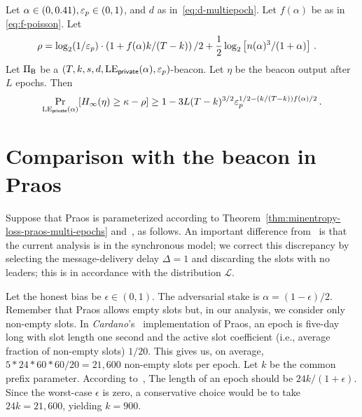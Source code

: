 \begin{theorem}\label{thm:beacon-poisson-multi-epoch}
  Let $\alpha \in (0, 0.41), \mathsf{\varepsilon}_p \in (0,1)$, 
  and $d$ as in~\eqref{eq:d-multiepoch}. 
  Let $f(\alpha)$ be as in \eqref{eq:f-poisson}.
  Let
  \begin{align}
      \rho&= \log_2(1/\mathsf{\varepsilon}_p) \cdot \left(1 + f(\alpha) k/(T-k) \right)/2
        + \frac{1}{2} \log_2 \left[ n(\alpha)^3 /(1+\alpha) \right] 
        \,.
        \label{eq:rho-poisson}
  \end{align}
  Let $\Pi_{\mathsf{B}}$ be a $(T,k,s,d,\mathrm{LE}_\mathsf{private}(\alpha), \mathsf{\varepsilon}_p)$-beacon.
  Let $\eta$ be the beacon output after $L$ epochs. 
  Then 
  $$
    \Pr_{\mathrm{LE}_\mathsf{private}(\alpha)}[H_\infty(\eta) \geq \kappa - \rho ] \geq 
      1 - 3 L (T - k)^{3/2} \mathsf{\varepsilon}_p^{1/2 - (k/(T-k)) f(\alpha)/2}
    \,.
  $$
\end{theorem}



\section{Comparison with the beacon in Praos}


Suppose that Praos is parameterized according to 
Theorem~\ref{thm:minentropy-loss-praos-multi-epochs} 
and~\cite[Theorem 9]{Praos}, as follows.
An important difference from~\cite[Theorem 9]{Praos} is that 
the current analysis is in the synchronous model; 
we correct this discrepancy by selecting the message-delivery delay $\Delta = 1$ 
and discarding the slots with no leaders; 
this is in accordance with the distribution $\mathcal{L}$.

Let the honest bias be $\epsilon \in (0,1)$.
The adversarial stake is $\alpha = (1-\epsilon)/2$. 
Remember that Praos allows empty slots but, 
in our analysis, we consider only non-empty slots. 
In \emph{Cardano}'s~\cite{Cardano} implementation of Praos, 
an epoch is five-day long with slot length one second 
and the active slot coefficient (i.e., average fraction of non-empty slots)  $1/20$. 
This gives us, on average, $5*24*60*60/20 = 21,600$ non-empty slots per epoch.
Let $k$ be the common prefix parameter.  
According to~\cite[Corollary 3]{Praos}, 
The length of an epoch should be $24 k/(1+\epsilon)$. 
Since the worst-case $\epsilon$ is zero, 
a conservative choice would be to take $24 k = 21,600$, yielding $k = 900$. 


